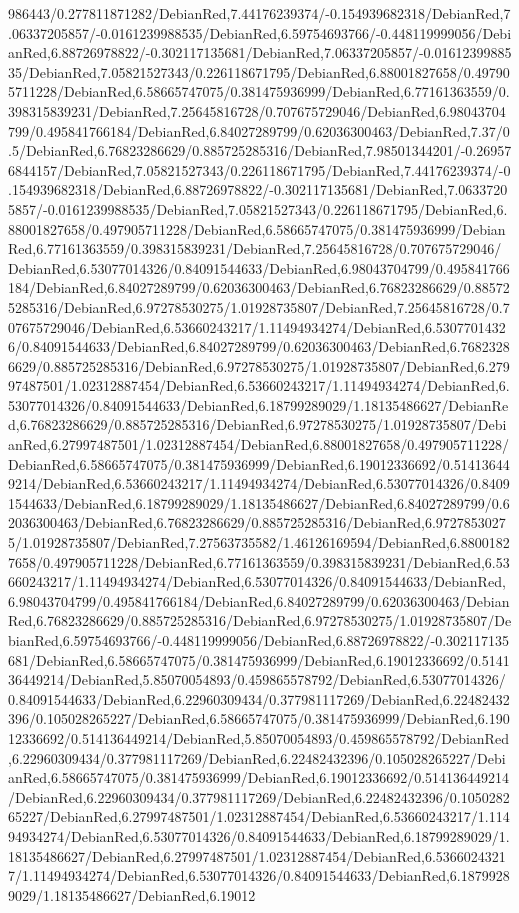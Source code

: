 {\begin{tikzternal}
{986443/0.277811871282/DebianRed,7.44176239374/-0.154939682318/DebianRed,7.06337205857/-0.0161239988535/DebianRed,6.59754693766/-0.448119999056/DebianRed,6.88726978822/-0.302117135681/DebianRed,7.06337205857/-0.0161239988535/DebianRed,7.05821527343/0.226118671795/DebianRed,6.88001827658/0.497905711228/DebianRed,6.58665747075/0.381475936999/DebianRed,6.77161363559/0.398315839231/DebianRed,7.25645816728/0.707675729046/DebianRed,6.98043704799/0.495841766184/DebianRed,6.84027289799/0.62036300463/DebianRed,7.37/0.5/DebianRed,6.76823286629/0.885725285316/DebianRed,7.98501344201/-0.269576844157/DebianRed,7.05821527343/0.226118671795/DebianRed,7.44176239374/-0.154939682318/DebianRed,6.88726978822/-0.302117135681/DebianRed,7.06337205857/-0.0161239988535/DebianRed,7.05821527343/0.226118671795/DebianRed,6.88001827658/0.497905711228/DebianRed,6.58665747075/0.381475936999/DebianRed,6.77161363559/0.398315839231/DebianRed,7.25645816728/0.707675729046/DebianRed,6.53077014326/0.84091544633/DebianRed,6.98043704799/0.495841766184/DebianRed,6.84027289799/0.62036300463/DebianRed,6.76823286629/0.885725285316/DebianRed,6.97278530275/1.01928735807/DebianRed,7.25645816728/0.707675729046/DebianRed,6.53660243217/1.11494934274/DebianRed,6.53077014326/0.84091544633/DebianRed,6.84027289799/0.62036300463/DebianRed,6.76823286629/0.885725285316/DebianRed,6.97278530275/1.01928735807/DebianRed,6.27997487501/1.02312887454/DebianRed,6.53660243217/1.11494934274/DebianRed,6.53077014326/0.84091544633/DebianRed,6.18799289029/1.18135486627/DebianRed,6.76823286629/0.885725285316/DebianRed,6.97278530275/1.01928735807/DebianRed,6.27997487501/1.02312887454/DebianRed,6.88001827658/0.497905711228/DebianRed,6.58665747075/0.381475936999/DebianRed,6.19012336692/0.514136449214/DebianRed,6.53660243217/1.11494934274/DebianRed,6.53077014326/0.84091544633/DebianRed,6.18799289029/1.18135486627/DebianRed,6.84027289799/0.62036300463/DebianRed,6.76823286629/0.885725285316/DebianRed,6.97278530275/1.01928735807/DebianRed,7.27563735582/1.46126169594/DebianRed,6.88001827658/0.497905711228/DebianRed,6.77161363559/0.398315839231/DebianRed,6.53660243217/1.11494934274/DebianRed,6.53077014326/0.84091544633/DebianRed,6.98043704799/0.495841766184/DebianRed,6.84027289799/0.62036300463/DebianRed,6.76823286629/0.885725285316/DebianRed,6.97278530275/1.01928735807/DebianRed,6.59754693766/-0.448119999056/DebianRed,6.88726978822/-0.302117135681/DebianRed,6.58665747075/0.381475936999/DebianRed,6.19012336692/0.514136449214/DebianRed,5.85070054893/0.459865578792/DebianRed,6.53077014326/0.84091544633/DebianRed,6.22960309434/0.377981117269/DebianRed,6.22482432396/0.105028265227/DebianRed,6.58665747075/0.381475936999/DebianRed,6.19012336692/0.514136449214/DebianRed,5.85070054893/0.459865578792/DebianRed,6.22960309434/0.377981117269/DebianRed,6.22482432396/0.105028265227/DebianRed,6.58665747075/0.381475936999/DebianRed,6.19012336692/0.514136449214/DebianRed,6.22960309434/0.377981117269/DebianRed,6.22482432396/0.105028265227/DebianRed,6.27997487501/1.02312887454/DebianRed,6.53660243217/1.11494934274/DebianRed,6.53077014326/0.84091544633/DebianRed,6.18799289029/1.18135486627/DebianRed,6.27997487501/1.02312887454/DebianRed,6.53660243217/1.11494934274/DebianRed,6.53077014326/0.84091544633/DebianRed,6.18799289029/1.18135486627/DebianRed,6.19012}
\end{tikzternal}}
